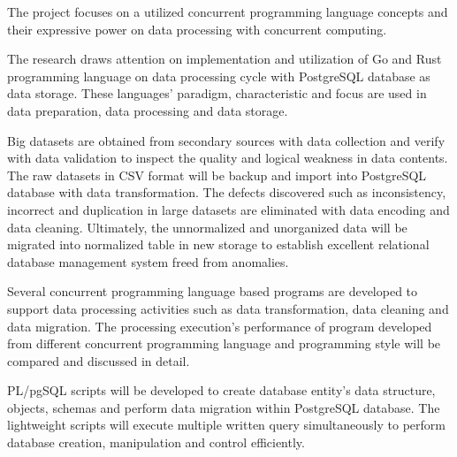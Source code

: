 \documentclass[12pt, oneside]{Thesis}
\begin{document}

\tableofcontents %

\listoftables %
%
\listoffigures %


\lstlistoflistings

\pagebreak
{} 

The project focuses on a utilized concurrent programming language concepts and their expressive power on data processing with concurrent computing.

The research draws attention on implementation and utilization of Go and Rust programming language on data processing cycle with PostgreSQL database as data storage. These languages’ paradigm, characteristic and focus are used in data preparation, data processing and data storage. 

Big datasets are obtained from secondary sources with data collection and verify with data validation to inspect the quality and logical weakness in data contents. The raw datasets in CSV format will be backup and import into PostgreSQL database with data transformation. The defects discovered such as inconsistency, incorrect and duplication in large datasets are eliminated with data encoding and data cleaning. Ultimately, the unnormalized and unorganized data will be migrated into normalized table in new storage to establish excellent relational database management system freed from anomalies. 

Several concurrent programming language based programs are developed to support data processing activities such as data transformation, data cleaning and data migration. The processing execution's performance of program developed from different concurrent programming language and programming style will be compared and discussed in detail. 

PL/pgSQL scripts will be developed to create database entity's data structure, objects, schemas and perform data migration within PostgreSQL database. The lightweight scripts will execute multiple written query simultaneously to perform database creation, manipulation and control efficiently.
\end{document}
